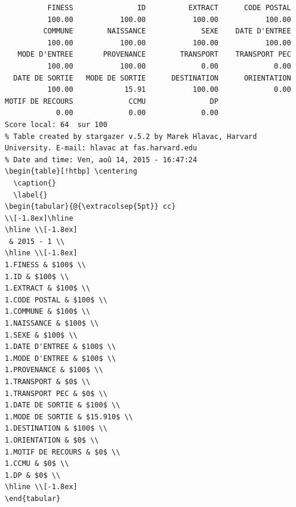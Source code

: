 \documentclass[]{article}
\begin{document}
\begin{verbatim}
          FINESS               ID          EXTRACT      CODE POSTAL 
          100.00           100.00           100.00           100.00 
         COMMUNE        NAISSANCE             SEXE    DATE D'ENTREE 
          100.00           100.00           100.00           100.00 
   MODE D'ENTREE       PROVENANCE        TRANSPORT    TRANSPORT PEC 
          100.00           100.00             0.00             0.00 
  DATE DE SORTIE   MODE DE SORTIE      DESTINATION      ORIENTATION 
          100.00            15.91           100.00             0.00 
MOTIF DE RECOURS             CCMU               DP 
            0.00             0.00             0.00 
Score local: 64  sur 100
% Table created by stargazer v.5.2 by Marek Hlavac, Harvard University. E-mail: hlavac at fas.harvard.edu
% Date and time: Ven, aoû 14, 2015 - 16:47:24
\begin{table}[!htbp] \centering 
  \caption{} 
  \label{} 
\begin{tabular}{@{\extracolsep{5pt}} cc} 
\\[-1.8ex]\hline 
\hline \\[-1.8ex] 
 & 2015 - 1 \\ 
\hline \\[-1.8ex] 
1.FINESS & $100$ \\ 
1.ID & $100$ \\ 
1.EXTRACT & $100$ \\ 
1.CODE POSTAL & $100$ \\ 
1.COMMUNE & $100$ \\ 
1.NAISSANCE & $100$ \\ 
1.SEXE & $100$ \\ 
1.DATE D'ENTREE & $100$ \\ 
1.MODE D'ENTREE & $100$ \\ 
1.PROVENANCE & $100$ \\ 
1.TRANSPORT & $0$ \\ 
1.TRANSPORT PEC & $0$ \\ 
1.DATE DE SORTIE & $100$ \\ 
1.MODE DE SORTIE & $15.910$ \\ 
1.DESTINATION & $100$ \\ 
1.ORIENTATION & $0$ \\ 
1.MOTIF DE RECOURS & $0$ \\ 
1.CCMU & $0$ \\ 
1.DP & $0$ \\ 
\hline \\[-1.8ex] 
\end{tabular} 

\end{verbatim}
\end{document}
